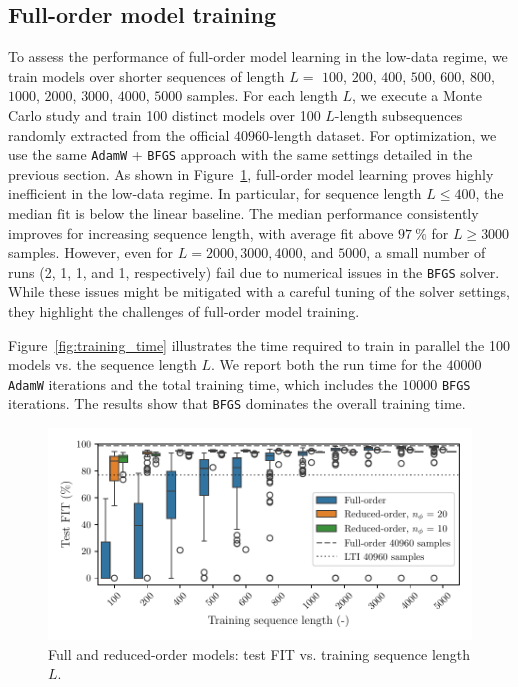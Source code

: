 \documentclass{article}
\begin{document}
\subsection{Full-order model training}
\label{sec:full_order_training}
To assess the performance of full-order model learning in the low-data regime, we train models over shorter sequences of length 
$L=$ $100$, $200$, $400$, $500$, $600$, $800$, $1000$, $2000$, $3000$, $4000$, $5000$ samples. 
For each length $L$, we execute a Monte Carlo study and train 100 distinct models over 100 $L$-length subsequences randomly extracted from the official $40960$-length dataset.  
For optimization, we use the same \texttt{AdamW} + \texttt{BFGS} approach with the same settings detailed in the previous section.
As shown in Figure~\ref{fig:boucwen_boxplot}, full-order model learning proves highly inefficient in the low-data regime. In particular, for sequence length $L \leq 400$, the median $\mathrm{fit}$ is below the linear baseline. 
The median performance consistently improves for increasing sequence length, with average \textrm{fit} above $97~\%$ for $L\geq 3000$ samples. 
However, even for $L=2000, 3000, 4000$, and $5000$, a small number of runs (2, 1, 1, and 1, respectively) fail due to numerical issues in the \texttt{BFGS} solver. While these issues might be mitigated with a careful tuning of the solver settings, they highlight the challenges of full-order model training.

Figure~\ref{fig:training_time} illustrates the time required to train in parallel the 100 models vs. the sequence length $L$. We report both the run time for the $40000$ \texttt{AdamW} iterations and the total training time, which includes the $10000$ \texttt{BFGS} iterations. The results show that \texttt{BFGS} dominates the overall training time.

\begin{figure}
    \centering
    \includegraphics[width=.8\hsize]{img/boxplot_paper.pdf}
    \caption{Full and reduced-order models: test FIT vs. training sequence length $L$.}
    \label{fig:boucwen_boxplot}
\end{figure}
\end{document}
